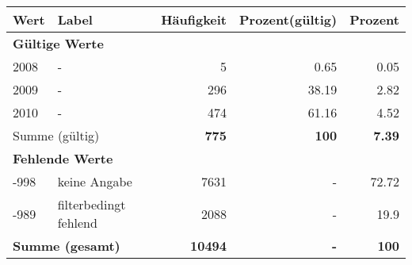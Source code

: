      \begin{longtable}{lXrrr}
     \toprule
     \textbf{Wert} & \textbf{Label} & \textbf{Häufigkeit} & \textbf{Prozent(gültig)} & \textbf{Prozent} \\
     \endhead
     \midrule
     \multicolumn{5}{l}{\textbf{Gültige Werte}}\\

     2008 &
     \multicolumn{1}{X}{ -  } &


       \num{5} &
       \num[round-mode=places,round-precision=2]{0.65} &
         \num[round-mode=places,round-precision=2]{0.05} \\

     2009 &
     \multicolumn{1}{X}{ -  } &


       \num{296} &
       \num[round-mode=places,round-precision=2]{38.19} &
         \num[round-mode=places,round-precision=2]{2.82} \\

     2010 &
     \multicolumn{1}{X}{ -  } &


       \num{474} &
       \num[round-mode=places,round-precision=2]{61.16} &
         \num[round-mode=places,round-precision=2]{4.52} \\
     \midrule
     \multicolumn{2}{l}{Summe (gültig)} &
       \textbf{\num{775}} &
     \textbf{\num{100}} &
       \textbf{\num[round-mode=places,round-precision=2]{7.39}} \\
     \multicolumn{5}{l}{\textbf{Fehlende Werte}}\\
       -998 &
       keine Angabe &
         \num{7631} &
        - &
         \num[round-mode=places,round-precision=2]{72.72} \\
       -989 &
       filterbedingt fehlend &
         \num{2088} &
        - &
         \num[round-mode=places,round-precision=2]{19.9} \\
     \midrule
     \multicolumn{2}{l}{\textbf{Summe (gesamt)}} &
          \textbf{\num{10494}} &
        \textbf{-} &
        \textbf{\num{100}} \\
     \bottomrule
     \end{longtable}
     
